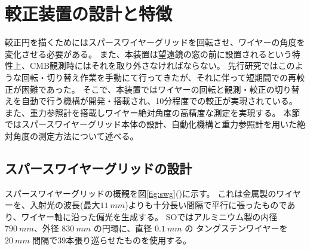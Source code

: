 \documentclass[../../main.tex]{subfiles}
\begin{document}
\section{較正装置の設計と特徴}
較正円を描くためにはスパースワイヤーグリッドを回転させ、ワイヤーの角度を変化させる必要がある。
また、本装置は望遠鏡の窓の前に設置されるという特性上、CMB観測時にはそれを取り外さなければならない。
先行研究ではこのような回転・切り替え作業を手動にて行ってきたが、それに伴って短期間での再較正が困難であった。
そこで、本装置ではワイヤーの回転と観測・較正の切り替えを自動で行う機構が開発・搭載され、10分程度での較正が実現されている。
また、重力参照計を搭載しワイヤー絶対角度の高精度な測定を実現する。
本節ではスパースワイヤーグリッド本体の設計、自動化機構と重力参照計を用いた絶対角度の測定方法について述べる。
\subsection{スパースワイヤーグリッドの設計}
\label{subsec:wg_design}
スパースワイヤーグリッドの概観を図\ref{fig:swg}()に示す。
これは金属製のワイヤーを、入射光の波長(最大$\SI{11}{mm}$)よりも十分長い間隔で平行に張ったものであり、ワイヤー軸に沿った偏光を生成する。
SOではアルミニウム製の内径$\SI{790}{mm}$、外径 $\SI{830}{mm}$ の円環に、直径 $\SI{0.1}{mm}$ の
タングステンワイヤーを $\SI{20}{mm}$ 間隔で$39$本張り巡らせたものを使用する\cite{swg:murata}。
\end{document}
